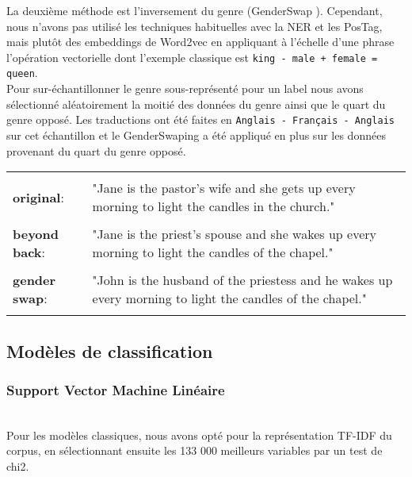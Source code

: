 La deuxième méthode est l'inversement du genre (GenderSwap ). Cependant, nous n'avons pas utilisé les techniques habituelles avec la NER et les PosTag, mais plutôt des embeddings de Word2vec en appliquant à l'échelle d'une phrase l'opération vectorielle dont l'exemple classique est \texttt{king - male + female = queen}.
\\
Pour sur-échantillonner le genre sous-représenté pour un label nous avons sélectionné aléatoirement la moitié des données du genre ainsi que le quart du genre opposé. Les traductions ont été faites en \texttt{Anglais - Français - Anglais} sur cet échantillon et le GenderSwaping a été appliqué en plus sur les données provenant du quart du genre opposé.

\begin{longtable}{l p{4in}}
    &\\
    \textbf{original}: &"Jane is the pastor's wife and she gets up every morning to light the candles in the church." \\
    &\\
    \textbf{beyond back}: &"Jane is the priest's spouse and she wakes up every morning to light the candles of the chapel."\\
    &\\
    \textbf{gender swap}: &"John is the husband of the priestess and he wakes up every morning to light the candles of the chapel."\\
    &
\end{longtable}


\subsection{Modèles de classification}
\subsubsection{Support Vector Machine Linéaire}
\hfill\\
Pour les modèles classiques, nous avons opté pour la représentation TF-IDF du corpus, en sélectionnant ensuite les \textsf{133 000} meilleurs variables par un test de chi2.

